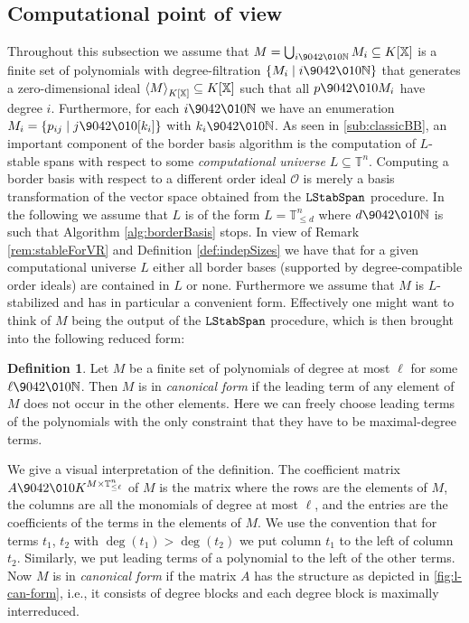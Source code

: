 \documentclass[11pt,oneside,english]{amsart}
\makeatletter
\numberwithin{equation}{section}
\numberwithin{figure}{section}
\theoremstyle{plain}
\theoremstyle{definition}
\newtheorem{defn}[thm]{Definition}
\theoremstyle{definition}
\theoremstyle{remark}
\theoremstyle{plain}
\theoremstyle{plain}
\theoremstyle{plain}
\theoremstyle{problem@}
\makeatother
\begin{document}
\subsection{Computational point of view}
\label{sec:polytope-comp-viewp}

Throughout this subsection we assume that
$M=\bigcup_{i{\9042\010}{\mathbb{N}}}M_{i}\subseteq{K[\mathbb{X}]}$
is a finite set of polynomials with degree-filtration $\{M_{i}\mid i{\9042\010}{\mathbb{N}}\}$
that generates a zero-dimensional ideal ${{\left\langle {M}\right\rangle}\sb{K[\mathbb{X}]}}\subseteq{K[\mathbb{X}]}$
such that all $p{\9042\010} M_{i}$ have degree \(i\).  Furthermore, for
each $i{\9042\010}{\mathbb{N}}$ we have an enumeration $M_{i}=\{p_{ij}\mid j{\9042\010}[k_{i}]\}$
with $k_{i}{\9042\010}{\mathbb{N}}$. As seen in \autoref{sub:classicBB}, an important
component of the border basis algorithm is the computation of $L$-stable
spans with respect to some \emph{computational universe} $L\subseteq{\mathbb{T}}^{n}$.
Computing a border basis with respect to a different order ideal ${\mathcal{O}}$
is merely a basis transformation of the vector space obtained from
the ${\ensuremath{\operatorname{{\textnormal{\texttt{{LStabSpan}}}}}}}$ procedure.
In the following we assume
that $L$ is of the form $L={\mathbb{T}}_{\leq d}^{n}$ where $d{\9042\010}{\mathbb{N}}$ is such that Algorithm \ref{alg:borderBasis}
stops.
In view of Remark \ref{rem:stableForVR}
and Definition \ref{def:indepSizes} we have that for a given computational
universe $L$ either all border bases (supported by degree-compatible
order ideals) are contained in $L$ or none.
Furthermore we assume that $M$ is $L$-stabilized and has in particular
a convenient form. Effectively one might want to think of $M$ being
the output of the ${\ensuremath{\operatorname{{\textnormal{\texttt{{LStabSpan}}}}}}}$ procedure, which is then brought into
the following reduced form:
\begin{defn}
\label{def:L-canonical-form}
Let $M$ be a finite set of polynomials of degree at most \(\ell\)
for some $\ell{\9042\010}{\mathbb{N}}$.
Then \(M\) is in \emph{canonical form}
if the leading term of any element of \(M\) does not occur
in the other elements.
Here we can freely choose leading terms of the polynomials
with the only constraint that they have to be maximal-degree terms.
\end{defn}
We give a visual interpretation of the definition.
The coefficient matrix
 $A{\9042\010} K^{M\times{\mathbb{T}}_{\leq \ell}^{n}}$ of \(M\)
is the matrix where
the rows are the elements of \(M\),
the columns are all the monomials of degree at most \(\ell\),
and the entries are the coefficients of the terms in the elements of \(M\).
We use the convention
that for terms $t_{1}$, $t_{2}$ with $\deg(t_{1})>\deg(t_{2})$
we put column $t_{1}$ to the left of column $t_{2}$.
Similarly, we put leading terms of a polynomial to
the left of the other terms.
Now $M$ is in \emph{canonical form} if
the matrix $A$ has
the structure as depicted in \autoref{fig:l-can-form}, i.e., it
consists of degree blocks and each degree block is maximally interreduced. 
\end{document}
